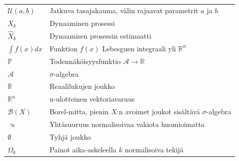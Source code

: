 \documentclass[
  12pt,
  a4paper, twoside]{book}
\begin{document}
\begin{table}
\begin{tabular}[t]{ll}
$\mathcal{U}(a, b)$ & Jatkuva tasajakauma, välin rajaavat parametrit $a$ ja $b$\\
$X_k$ & Dynaaminen prosessi\\
$\hat{X}_k$ & Dynaamisen prosessin estimaatti\\
\addlinespace
$\int f(x)dx$ & Funktion $f(x)$ Lebesguen integraali yli $\mathbb{R}^n$\\
$\mathbb{P}$ & Todennäköisyysfunktio $\mathcal{A}\rightarrow\mathbb{R}$\\
$\mathcal{A}$ & $\sigma$-algebra\\
$\mathbb{R}$ & Reaalilukujen joukko\\
$\mathbb{R}^n$ & n-ulotteinen vektoriavaruus\\
\addlinespace
$\mathcal{B}(X)$ & Borel-mitta, pienin $X$:n avoimet joukot sisältävä $\sigma$-algebra\\
$\propto$ & Yhtäsuuruus normalisoivaa vakiota huomioimatta\\
$\emptyset$ & Tyhjä joukko\\
$\Omega_k$ & Painot aika-askeleella $k$ normalisoiva tekijä\\
\bottomrule
\end{tabular}
\end{table}
\end{document}
